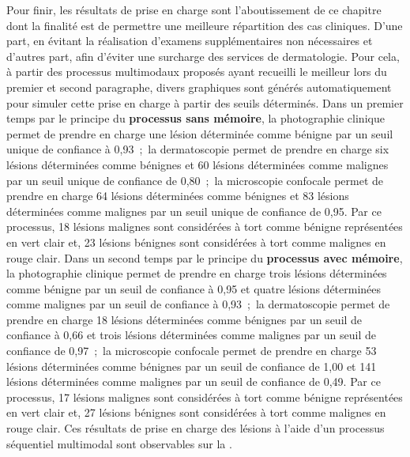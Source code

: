 Pour finir, les résultats de prise en charge sont l'aboutissement de ce chapitre dont la finalité est de permettre une meilleure répartition des cas cliniques. D'une part, en évitant la réalisation d'examens supplémentaires non nécessaires et d'autres part, afin d'éviter une surcharge des services de dermatologie. Pour cela, à partir des processus multimodaux proposés ayant recueilli le meilleur \fscore{} lors du premier et second paragraphe, divers graphiques sont générés automatiquement pour simuler cette prise en charge à partir des seuils déterminés. Dans un premier temps par le principe du \textbf{processus sans mémoire}, la photographie clinique permet de prendre en charge une lésion déterminée comme bénigne par un seuil unique de confiance à 0,93~;~la dermatoscopie permet de prendre en charge six lésions déterminées comme bénignes et 60 lésions déterminées comme malignes par un seuil unique de confiance de 0,80~;~la microscopie confocale permet de prendre en charge 64 lésions déterminées comme bénignes et 83 lésions déterminées comme malignes par un seuil unique de confiance de 0,95. Par ce processus, 18 lésions malignes sont considérées à tort comme bénigne représentées en vert clair et, 23 lésions bénignes sont considérées à tort comme malignes en rouge clair. Dans un second temps par le principe du \textbf{processus avec mémoire}, la photographie clinique permet de prendre en charge trois lésions déterminées comme bénigne par un seuil de confiance à 0,95 et quatre lésions déterminées comme malignes par un seuil de confiance à 0,93~;~la dermatoscopie permet de prendre en charge 18 lésions déterminées comme bénignes par un seuil de confiance à 0,66 et trois lésions déterminées comme malignes par un seuil de confiance de 0,97~;~la microscopie confocale permet de prendre en charge 53 lésions déterminées comme bénignes par un seuil de confiance de 1,00 et 141 lésions déterminées comme malignes par un seuil de confiance de 0,49. Par ce processus, 17 lésions malignes sont considérées à tort comme bénigne représentées en vert clair et, 27 lésions bénignes sont considérées à tort comme malignes en rouge clair. Ces résultats de prise en charge des lésions à l'aide d'un processus séquentiel multimodal sont observables sur la .\par

